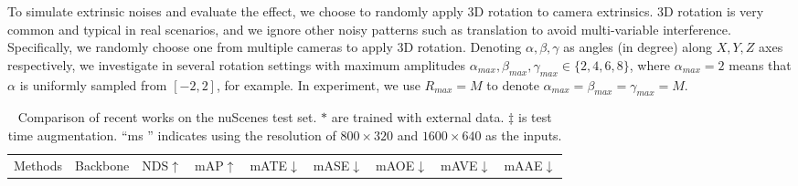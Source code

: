 \documentclass[10pt,twocolumn,letterpaper]{article}
\begin{document}
To simulate extrinsic noises and evaluate the effect, we choose to randomly apply 3D rotation to camera extrinsics. 3D rotation is very common and typical in real scenarios, and we ignore other noisy patterns such as translation to avoid multi-variable interference.
Specifically, we randomly choose one from multiple cameras to apply 3D rotation. Denoting $\alpha, \beta, \gamma$ as angles (in degree) along $X, Y, Z$ axes respectively, we investigate in several rotation settings with maximum amplitudes $\alpha_{max}, \beta_{max}, \gamma_{max} \in \{2, 4, 6, 8\}$, where $\alpha_{max}=2$ means that $\alpha$ is uniformly sampled from $[-2, 2]$, for example. In experiment, we use $R_{max}=M$ to denote $\alpha_{max} = \beta_{max} = \gamma_{max} = M$. 


\begin{table*}[t!]
\begin{center}
\caption{Comparison of recent works on the nuScenes test set. $\ast$ are trained with external data.  $\ddagger$ is test time augmentation. “ms ” indicates using the resolution of $800\times320$ and $1600\times640$ as the inputs.}
\label{table:2}
\setlength{\tabcolsep}{5pt}
\begin{tabular}{l|c|ccccccc}
\hline
Methods & Backbone & NDS$\uparrow$ & mAP$\uparrow$ & mATE$\downarrow$ & mASE$\downarrow$ & mAOE$\downarrow$ & mAVE$\downarrow$ & mAAE$\downarrow$ \\


\end{tabular}
\end{center}
\end{table*}
\end{document}
